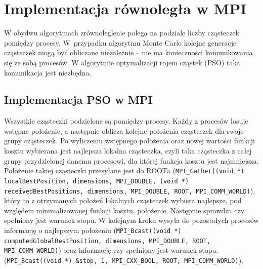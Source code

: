 \documentclass[11pt, a4paper, oneside]{article}
\begin{document}
\section{Implementacja równoległa w MPI}

W obydwu algorytmach zrównoleglenie polega na podziale liczby cząsteczek pomiędzy procesy. W~przypadku algorytmu Monte Carlo kolejne generacje cząsteczek mogą być obliczane niezależnie -- nie ma konieczności komunikowania się ze sobą procesów. W algorytmie optymalizacji rojem cząstek (PSO) taka komunikacja jest niezbędna. 


\subsection{Implementacja PSO w MPI}

Wszystkie cząsteczki podzielone są pomiędzy procesy. Każdy z procesów losuje wstępne położenie, a następnie oblicza kolejne położenia cząsteczek dla swoje grupy cząsteczek. Po wyliczeniu wstępnego położenia oraz nowej wartości funkcji kosztu wybierana jest najlepsza lokalna cząsteczka, czyli taka cząsteczka z całej grupy przydzielonej danemu procesowi, dla której funkcja kosztu jest najmniejsza. Położenie takiej cząsteczki przesyłane jest do ROOTa (\lstinline[style=mycpp]{MPI_Gather((void *) localBestPosition, dimensions, MPI_DOUBLE, (void *) receivedBestPositions, dimensions, MPI_DOUBLE, ROOT, MPI_COMM_WORLD)}), który to z otrzymanych położeń lokalnych cząsteczek wybiera najlepsze, pod względem minimalizowanej funkcji kosztu, położenie. Następnie sprawdza czy spełniony jest warunek stopu. W kolejnym kroku wysyła do pozostałych procesów informację o najlepszym położeniu (\lstinline[style=mycpp]{MPI_Bcast((void *) computedGlobalBestPosition, dimensions, MPI_DOUBLE, ROOT, MPI_COMM_WORLD)}) oraz informację czy spełniony jest warunek stopu. (\lstinline[style=mycpp]{MPI_Bcast((void *) &stop, 1, MPI_CXX_BOOL, ROOT, MPI_COMM_WORLD)}).
\end{document}
